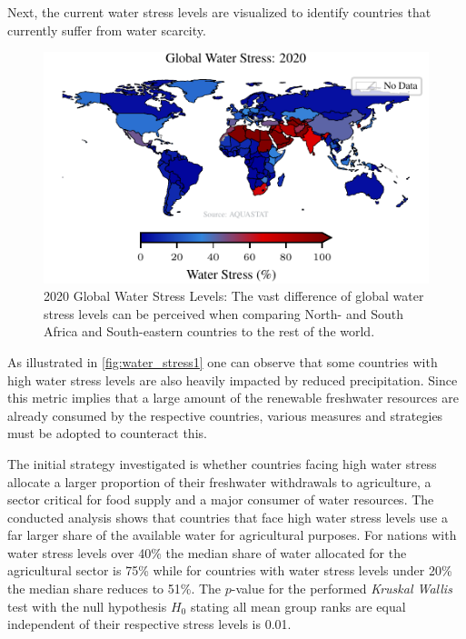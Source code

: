 \documentclass{article}
\theoremstyle{plain}
\theoremstyle{definition}
\theoremstyle{remark}
\begin{document}
Next, the current water stress levels are visualized to identify countries that currently suffer from water scarcity. 
\begin{figure}
    \centering
    \includegraphics{fig/global_water_stress.pdf}
    \caption{2020 Global Water Stress Levels: The vast difference of global water stress levels can be perceived when comparing North- and South Africa and South-eastern countries to the rest of the world.}
    \label{fig:water_stress1}
\end{figure}
As illustrated in \autoref{fig:water_stress1} one can observe that some countries with high water stress levels are also heavily impacted by reduced precipitation. Since this metric implies that a large amount of the renewable freshwater resources are already consumed by the respective countries, various measures and strategies must be adopted \cite{Tortajada2019, Belhassan2021} to counteract this.

The initial strategy investigated is whether countries facing high water stress allocate a larger proportion of their freshwater withdrawals to agriculture, a sector critical for food supply and a major consumer of water resources. The conducted analysis shows that countries that face high water stress levels use a far larger share of the available water for agricultural purposes. For nations with water stress levels over 40\% the median share of water allocated for the agricultural sector is 75\% while for countries with water stress levels under 20\% the median share reduces to 51\%. The $p$-value for the performed \textit{Kruskal Wallis} test with the null hypothesis $H_0$ stating all mean group ranks are equal independent of their respective stress levels is 0.01.
\end{document}
